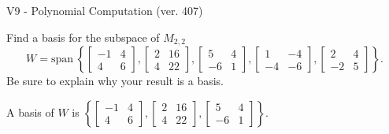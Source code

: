 \begin{exercise}
  \begin{exerciseTitle}V9 - Polynomial Computation (ver. 407)\end{exerciseTitle}
  \begin{exerciseStatement}
    Find a basis for the subspace of \(M_{2,2}\) 
\[W=\mathrm{span}\ \left\{\left[\begin{array}{cc}
-1 & 4 \\
4 & 6
\end{array}\right] , \left[\begin{array}{cc}
2 & 16 \\
4 & 22
\end{array}\right] , \left[\begin{array}{cc}
5 & 4 \\
-6 & 1
\end{array}\right] , \left[\begin{array}{cc}
1 & -4 \\
-4 & -6
\end{array}\right] , \left[\begin{array}{cc}
2 & 4 \\
-2 & 5
\end{array}\right]\right\}.\]
 Be sure to explain why your result is a basis.


  \end{exerciseStatement}
  \begin{exerciseAnswer}
   A basis of \(W\) is  \(\left\{\left[\begin{array}{cc}
-1 & 4 \\
4 & 6
\end{array}\right] , \left[\begin{array}{cc}
2 & 16 \\
4 & 22
\end{array}\right] , \left[\begin{array}{cc}
5 & 4 \\
-6 & 1
\end{array}\right]\right\}\).
  


  \end{exerciseAnswer}
\end{exercise}